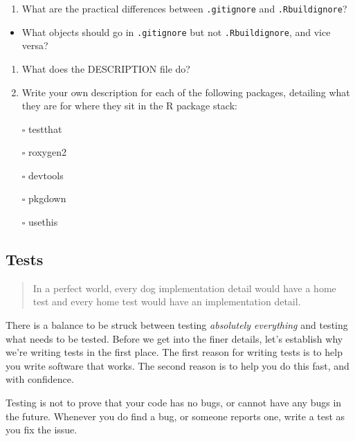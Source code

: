 \documentclass[
  letterpaper,
  DIV=11,
  numbers=noendperiod]{scrreprt}
\providecommand{\tightlist}{%
  \setlength{\itemsep}{0pt}\setlength{\parskip}{0pt}}\usepackage{longtable,booktabs,array}
\begin{document}
\begin{enumerate}
\def\labelenumi{\arabic{enumi}.}
\tightlist
\item
  What are the practical differences between \texttt{.gitignore} and
  \texttt{.Rbuildignore}?
\end{enumerate}

\begin{itemize}
\tightlist
\item
  What objects should go in \texttt{.gitignore} but not
  \texttt{.Rbuildignore}, and vice versa?
\end{itemize}

\begin{enumerate}
\def\labelenumi{\arabic{enumi}.}
\setcounter{enumi}{1}
\tightlist
\item
  What does the DESCRIPTION file do?
\item
  Write your own description for each of the following packages,
  detailing what they are for where they sit in the R package stack:
\end{enumerate}

\begin{itemize}
\tightlist
\item[$\square$]
  testthat
\item[$\square$]
  roxygen2
\item[$\square$]
  devtools
\item[$\square$]
  pkgdown
\item[$\square$]
  usethis
\end{itemize}

\subsection{Tests}\label{tests}

\begin{quote}
In a perfect world, every dog implementation detail would have a home
test and every home test would have an implementation detail.
\end{quote}

There is a balance to be struck between testing \emph{absolutely
everything} and testing what needs to be tested. Before we get into the
finer details, let's establish why we're writing tests in the first
place. The first reason for writing tests is to help you write software
that works. The second reason is to help you do this fast, and with
confidence.

Testing is not to prove that your code has no bugs, or cannot have any
bugs in the future. Whenever you do find a bug, or someone reports one,
write a test as you fix the issue.
\end{document}

